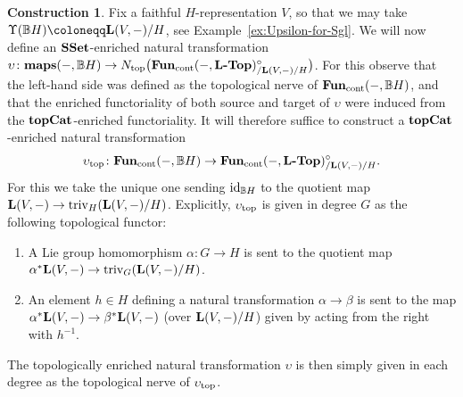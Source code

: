 \documentclass[reqno]{memo-l}
\theoremstyle{mythm}
\theoremstyle{definition}
\newtheorem{constr}[thm]{Construction}
\numberwithin{equation}{section}
\renewcommand{\top}{{\textup{top}}}
\newcommand{\Ntop}{{N_\textup{top}}}
\newcommand{\cat}[1]{\textbf{\textup{#1}}}
\newcommand{\FUN}{\cat{Fun}}
\newcommand{\maps}{\cat{maps}}
\newcommand{\triv}{{\textup{triv}}}
\newcommand{\id}{\textup{id}}
\newcommand{\BGcat}[1]{\mathbb B{#1}}
\begin{document}
\begin{constr}
    Fix a faithful $H$-representation $V$, so that we may take $\Upsilon(\BGcat{H})\coloneqq\cat{L}(V,-)/H$, see Example~\ref{ex:Upsilon-for-Sgl}. We will now define an $\cat{SSet}$-enriched natural transformation $\upsilon\colon\maps(-,\BGcat{H})\to\Ntop\big(\FUN_\text{cont}(-,\cat{$\cat{L}$-Top})_{/\cat{L}(V,-)/H}^\circ\big)$. For this observe that the left-hand side was defined as the topological nerve of $\cat{Fun}_\text{cont}(-,\BGcat{H})$, and that the enriched functoriality of both source and target of $\upsilon$ were induced from the $\cat{topCat}$-enriched functoriality. It will therefore suffice to construct a $\cat{topCat}$-enriched natural transformation \[\upsilon_\top\colon\FUN_\text{cont}(-,\BGcat{H})\to\cat{Fun}_\text{cont}(-,\cat{$\cat{L}$-Top})_{/\cat{L}(V,-)/H}^\circ.\] For this we take the unique one sending $\id_{\BGcat{H}}$ to the quotient map $\cat{L}(V,-)\to\triv_H(\cat{L}(V,-)/H)$. Explicitly, $\upsilon_\top$ is given in degree $G$ as the following topological functor:
    \begin{enumerate}
        \item A Lie group homomorphism $\alpha\colon G\to H$ is sent to the quotient map $\alpha^*\cat{L}(V,-)\to\triv_G(\cat{L}(V,-)/H)$.
        \item An element $h\in H$ defining a natural transformation $\alpha\to\beta$ is sent to the map $\alpha^*\cat{L}(V,-)\to \beta^*\cat{L}(V,-)$ (over $\cat{L}(V,-)/H$) given by acting from the right with $h^{-1}$.
    \end{enumerate}
    The topologically enriched natural transformation $\upsilon$ is then simply given in each degree as the topological nerve of $\upsilon_\top$.
\end{constr}
\end{document}
